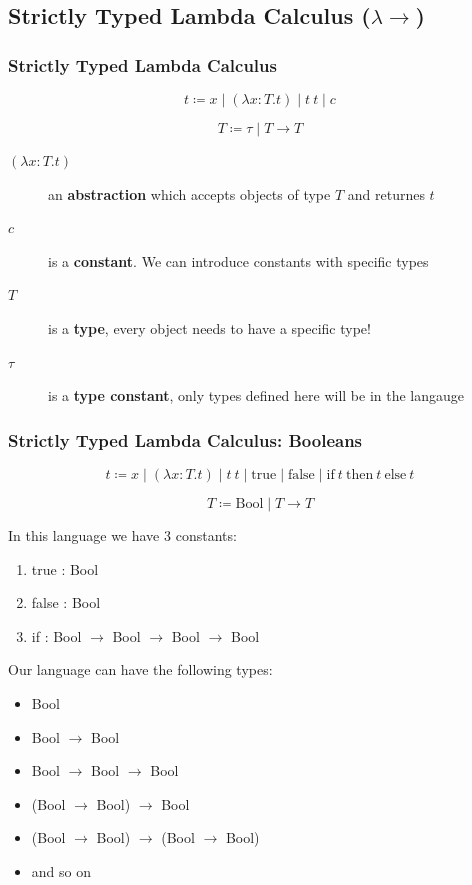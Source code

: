 \documentclass{beamer}
\newcommand{\bool}{\text{Bool}}
\newcommand{\true}{\text{true}}
\newcommand{\false}{\text{false}}
\newcommand{\ha}[3]{\text{if}\ #1\ \text{then}\ #2\ \text{else}\ #3}
\begin{document}
\subsection{Strictly Typed Lambda Calculus ($\lambda \rightarrow$)}

\begin{frame}[fragile]
  \frametitle{Strictly Typed Lambda Calculus}

  $$ t \coloneqq x  \mid  (\lambda x : T . t)  \mid   t\  t \mid c $$

  $$ T \coloneqq \tau \mid T \rightarrow T $$

  \begin{description}
    \item[$(\lambda x : T . t)$] an \textbf{abstraction} which accepts objects of type $T$ and returnes $t$
    \item[$c$] is a \textbf{constant}. We can introduce constants with specific types
    \item[$T$] is a \textbf{type}, every object needs to have a specific type!
    \item[$\tau$] is a \textbf{type constant}, only types defined here will be in the langauge
  \end{description}
\end{frame}


\begin{frame}[fragile]
  \frametitle{Strictly Typed Lambda Calculus: Booleans}

  $$
    t \coloneqq x
      \mid (\lambda x : T . t)
      \mid t\  t
      \mid \true
      \mid \false
      \mid \ha{t}{t}{t}
  $$

  $$ T \coloneqq \bool \mid T \rightarrow T $$

  In this language we have 3 constants:
  \begin{enumerate}
    \item true : Bool
    \item false : Bool
    \item if : Bool $\rightarrow$ Bool $\rightarrow$ Bool $\rightarrow$ Bool
  \end{enumerate}

  \pause

  Our language can have the following types:
  \begin{itemize}
    \item[-] Bool
    \item[-] Bool $\rightarrow$ Bool
    \item[-] Bool $\rightarrow$ Bool $\rightarrow$ Bool
    \item[-] (Bool $\rightarrow$ Bool) $\rightarrow$ Bool
    \item[-] (Bool $\rightarrow$ Bool) $\rightarrow$ (Bool $\rightarrow$ Bool)
    \item[-] and so on
  \end{itemize}
\end{frame}
\end{document}
